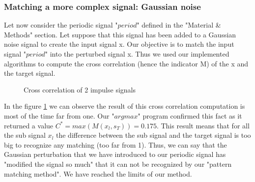 \documentclass[a4paper]{article}
\begin{document}
	\subsubsection{Matching a more complex signal: Gaussian noise}
    Let now consider the periodic signal "$period$" defined in the "Material \& Methods" section.  Let suppose that this signal has been added to a Gaussian noise signal to create the input signal x.   Our objective is to match the input signal "$period$" into the perturbed signal x.   Thus we used our implemented algorithms to compute the cross correlation (hence the indicator M) of the x and the target signal.
\begin{figure}[!htb]\centering
    \begin{minipage}{0.49\textwidth}  \end{minipage}
    \caption{Cross correlation of 2 impulse signals}
    \label{correlationOnImpulse.png}
\end{figure}
In the figure \ref{correlationOnImpulse.png} we can observe the result of this cross correlation computation is most of the time far from one.   Our "$argmax$" program confirmed this fact as it returned a value $C^* = max(M(x_{l}, s_{T})) = 0.175$.
This result means that for all the sub signal $x_{l}$ the difference between the sub signal and the target signal is too big to recognize any matching (too far from 1).   Thus, we can say that the Gaussian perturbation that we have introduced to our periodic signal has "modified the signal so much" that it can not be recognized by our "pattern matching method".   We have reached the limits of our method.  
\end{document}
